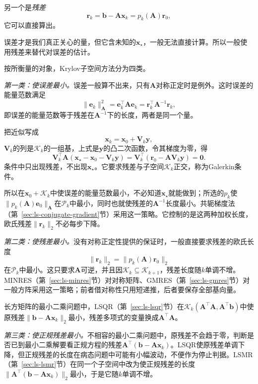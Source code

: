 另一个是\emph{残差}
\[
 \bm r_k=\bm b-\bm A\bm x_k=p_k(\bm A)\bm r_0 ,
\]
它可以直接算出。

误差才是我们真正关心的量，但它含未知的$\bm x_\star$，一般无法直接计算。所以一般使用残差来替代对误差的估计。

按所衡量的对象，Krylov子空间方法分为四类。

\emph{第一类：使误差最小。}误差一般算不出来，只有$\bm A$对称正定时是例外。这时误差的能量范数满足
\begin{equation}
 \lVert\bm e_k\rVert_{\bm A}^2=\bm e_k^\top\bm A\bm e_k=\bm r_k^\top\bm A^{-1}\bm r_k ,
 \label{eq:ls-krylov-energy-norm-identity}
\end{equation}
即误差的能量范数等于残差在$\bm A^{-1}$下的长度，两者是同一个量。

把近似写成
\[
  \bm x_k=\bm x_0+\bm V_k\bm y ,
\]
$\bm V_k$的列是$\mathcal K_k$的一组基，上式是$\bm y$的凸二次函数，令其梯度为零，得
\begin{equation}
 \bm V_k^\top\bm A(\bm x_\star-\bm x_0-\bm V_k\bm y)=\bm V_k^\top(\bm r_0-\bm A\bm V_k\bm y)=\bm0 .
 \label{eq:ls-krylov-galerkin-condition}
\end{equation}
条件中只出现残差，不出现$\bm x_\star$。它要求残差与子空间$\mathcal K_k$正交，称为Galerkin条件。

所以在$\bm x_0+\mathcal K_k$中使误差的能量范数最小，不必知道$\bm x_\star$就能做到；所选的$p_k$使$\lVert p_k(\bm A)\bm e_0\rVert_{\bm A}$在$\mathcal P_k$中最小，同时也就使残差的$\bm A^{-1}$长度最小。共轭梯度法（第~\ref{sec:ls-conjugate-gradient}节）采用这一策略。它控制的是这两种加权长度，欧氏残差$\lVert\bm r_k\rVert_2$不必每步下降。

\emph{第二类：使残差最小。}没有对称正定性提供的保证时，一般直接要求残差的欧氏长度
\[
 \lVert\bm r_k\rVert_2=\lVert p_k(\bm A)\bm r_0\rVert_2
\]
在$\mathcal P_k$中最小。这只要求$\bm A$可逆，并且因$\mathcal K_k\subseteq\mathcal K_{k+1}$，残差长度随$k$单调不增。MINRES（第~\ref{sec:ls-minres}节）对对称矩阵、GMRES（第~\ref{sec:ls-gmres}节）对一般方阵采用这一策略；前者借对称性只用短递推，后者要保存全部基向量。

长方矩阵的最小二乘问题中，LSQR（第~\ref{sec:ls-lsqr}节）在$\mathcal K_k(\bm A^\top\bm A,\bm A^\top\bm b)$中使原残差$\lVert\bm b-\bm A\bm x_k\rVert_2$最小，残差多项式的变量换成$\bm A^\top\bm A$。

\emph{第三类：使正规残差最小。}不相容的最小二乘问题中，原残差不会趋于零，判断是否已到最小二乘解要看正规方程的残差$\bm A^\top(\bm b-\bm A\bm x_k)$。LSQR使原残差单调下降，但正规残差的长度在病态问题中可能有小幅波动，不便作为停止判据。LSMR（第~\ref{sec:ls-lsmr}节）在同一个子空间中改为使正规残差的长度$\lVert\bm A^\top(\bm b-\bm A\bm x_k)\rVert_2$最小，于是它随$k$单调不增。

